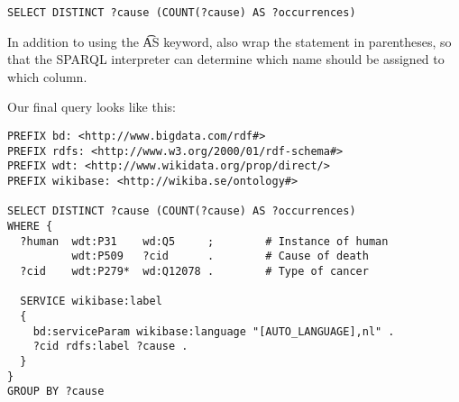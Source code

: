 \begin{siderules}
\begin{verbatim}
SELECT DISTINCT ?cause (COUNT(?cause) AS ?occurrences)
\end{verbatim}
\end{siderules}

  In addition to using the \t{AS} keyword, also wrap the statement in
  parentheses, so that the SPARQL interpreter can determine which name
  should be assigned to which column.

  Our final query looks like this:

\begin{siderules}
\begin{verbatim}
PREFIX bd: <http://www.bigdata.com/rdf#>
PREFIX rdfs: <http://www.w3.org/2000/01/rdf-schema#>
PREFIX wdt: <http://www.wikidata.org/prop/direct/>
PREFIX wikibase: <http://wikiba.se/ontology#>

SELECT DISTINCT ?cause (COUNT(?cause) AS ?occurrences)
WHERE {
  ?human  wdt:P31    wd:Q5     ;        # Instance of human
          wdt:P509   ?cid      .        # Cause of death
  ?cid    wdt:P279*  wd:Q12078 .        # Type of cancer

  SERVICE wikibase:label
  {
    bd:serviceParam wikibase:language "[AUTO_LANGUAGE],nl" .
    ?cid rdfs:label ?cause .
  }
}
GROUP BY ?cause
\end{verbatim}
\end{siderules}
